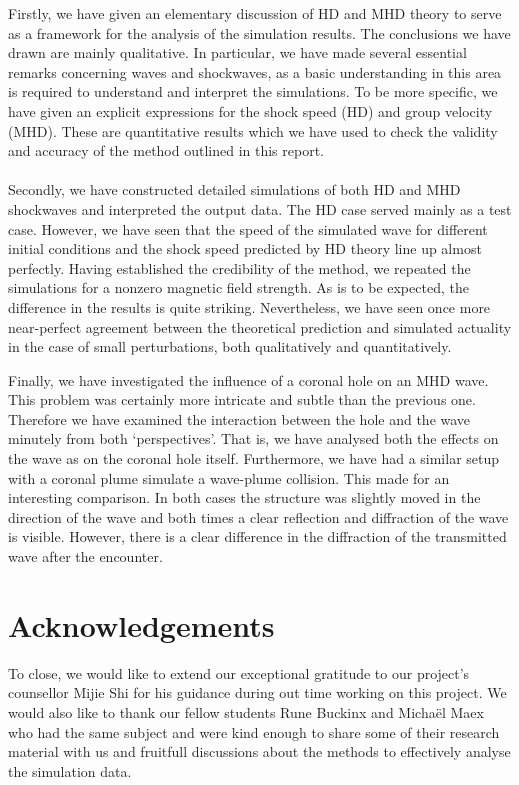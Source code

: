 Firstly, we have given an elementary discussion of HD and MHD theory to serve as a framework for the analysis of the simulation results. The conclusions we have drawn are mainly qualitative. In particular, we have made several essential remarks concerning waves and shockwaves, as a basic understanding in this area is required to understand and interpret the simulations. To be more specific, we have given an explicit expressions for the shock speed (HD) and group velocity (MHD). These are quantitative results which we have used to check the validity and accuracy of the method outlined in this report. \\
\\
Secondly, we have constructed detailed simulations of both HD and MHD shockwaves and interpreted the output data. 
The HD case served mainly as a test case. 
However, we have seen that the speed of the simulated wave for different initial conditions and the shock speed predicted by HD theory line up almost perfectly. 
Having established the credibility of the method, we repeated the simulations for a nonzero magnetic field strength. 
As is to be expected, the difference in the results is quite striking. 
Nevertheless, we have seen once more near-perfect agreement between the theoretical prediction and simulated actuality in the case of small perturbations, both qualitatively and quantitatively.

Finally, we have investigated the influence of a coronal hole on an MHD wave. 
This problem was certainly more intricate and subtle than the previous one. 
Therefore we have examined the interaction between the hole and the wave minutely from both `perspectives'. 
That is, we have analysed both the effects on the wave as on the coronal hole itself. 
Furthermore, we have had a similar setup with a coronal plume simulate a wave-plume collision. 
This made for an interesting comparison. 
In both cases the structure was slightly moved in the direction of the wave and both times a clear reflection and diffraction of the wave is visible. 
However, there is a clear difference in the diffraction of the transmitted wave after the encounter. 

 

\section*{Acknowledgements}
To close, we would like to extend our exceptional gratitude to our project’s counsellor Mijie Shi for his guidance during out time working on this project. 
We would also like to thank our fellow students Rune Buckinx and Michaël Maex who had the same subject and were kind enough to share some of their research material with us and fruitfull discussions about the methods to effectively analyse the simulation data.
